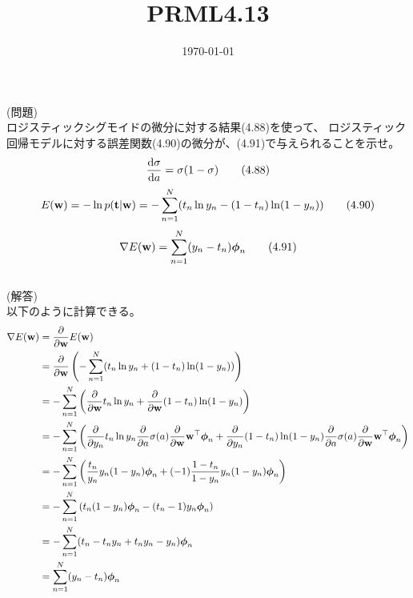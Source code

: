 \documentclass{jsarticle}
\title{PRML4.13}
\date{\today}
\begin{document}
\maketitle

(問題)\\
ロジスティックシグモイドの微分に対する結果(4.88)を使って、
ロジスティック回帰モデルに対する誤差関数(4.90)の微分が、(4.91)で与えられることを示せ。
\begin{align*}
    \frac{{\rm d}\sigma}{{\rm d}a}=\sigma(1-\sigma)\tag{4.88}
    \end{align*}
\begin{align*}
    E({\bf w})=-\ln p({\bf t}|{\bf w})=-\sum_{n=1}^N(t_n\ln y_n-(1-t_n)\ln(1-y_n))\tag{4.90}
    \end{align*}
\begin{align*}
    \nabla E({\bf w})=\sum_{n=1}^N(y_n-t_n){\boldsymbol\phi}_n\tag{4.91}
    \end{align*}
\\
(解答) \\
以下のように計算できる。
\begin{align*}
    \nabla E({\bf w})
    &=\frac{\partial}{\partial{\bf w}}E({\bf w})\\
    &=\frac{\partial}{\partial{\bf w}}\left(-\sum_{n=1}^N(t_n\ln y_n+(1-t_n)\ln(1-y_n))\right)\\
    &=-\sum_{n=1}^N\left(\frac{\partial}{\partial{\bf w}}t_n\ln y_n+\frac{\partial}{\partial{\bf w}}(1-t_n)\ln(1-y_n)\right)\\
    &=-\sum_{n=1}^N\left(\frac{\partial}{\partial y_n}t_n\ln y_n\frac{\partial}{\partial a}\sigma(a)\frac{\partial}{\partial{\bf w}}{\bf w}^\top{\boldsymbol\phi}_n+\frac{\partial}{\partial y_n}(1-t_n)\ln(1-y_n)\frac{\partial}{\partial a}\sigma(a)\frac{\partial}{\partial{\bf w}}{\bf w}^\top{\boldsymbol\phi}_n\right)\\
    &=-\sum_{n=1}^N\left(\frac{t_n}{y_n}y_n(1-y_n){\boldsymbol\phi}_n+(-1)\frac{1-t_n}{1-y_n}y_n(1-y_n){\boldsymbol\phi}_n\right)\\
    &=-\sum_{n=1}^N\left(t_n(1-y_n){\boldsymbol\phi}_n-(t_n-1)y_n{\boldsymbol\phi}_n\right)\\
    &=-\sum_{n=1}^N(t_n-t_ny_n+t_ny_n-y_n){\boldsymbol\phi}_n\\
    &=\sum_{n=1}^N(y_n-t_n){\boldsymbol\phi}_n\\
    \end{align*}
\end{document}
